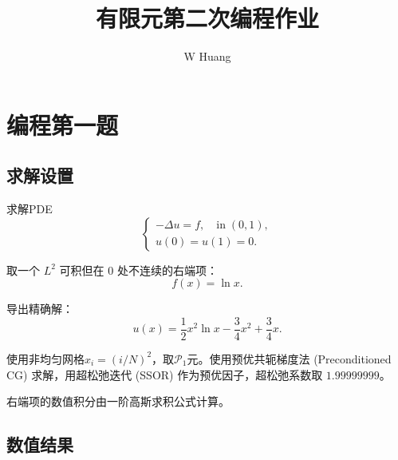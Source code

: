 \documentclass[lang=cn,11pt,a4paper]{elegantpaper}
\title{有限元第二次编程作业}
\author{W Huang}
\date{\zhtoday}
\begin{document}
\maketitle

\section{编程第一题}

\subsection{求解设置}

求解PDE
\begin{equation}
    \left\{
        \begin{array}{l}
            -\Delta u = f,\quad \text{in}\;(0,1),\\
            u(0) = u(1) = 0.
        \end{array}
    \right.
\end{equation}

取一个 $L^2$ 可积但在 $0$ 处不连续的右端项：
\begin{equation}
    f(x)=\ln x.
\end{equation}

导出精确解：
\begin{equation}
    u(x)=\frac{1}{2}x^2\ln x - \frac{3}{4}x^2 + \frac{3}{4}x.
\end{equation}

使用非均匀网格$x_i=(i/N)^2$，取$\mathcal{P}_1$元。使用预优共轭梯度法 (Preconditioned CG) 求解，用超松弛迭代 (SSOR) 作为预优因子，超松弛系数取 $1.99999999$。

右端项的数值积分由一阶高斯求积公式计算。

\subsection{数值结果}
\end{document}

